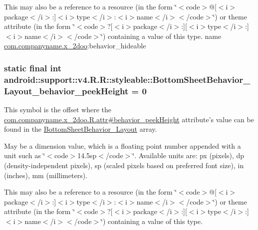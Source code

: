 This may also be a reference to a resource (in the form \char`\"{}$<$code$>$@\mbox{[}$<$i$>$package$<$/i$>$:\mbox{]}$<$i$>$type$<$/i$>$:$<$i$>$name$<$/i$>$$<$/code$>$\char`\"{}) or theme attribute (in the form \char`\"{}$<$code$>$?\mbox{[}$<$i$>$package$<$/i$>$:\mbox{]}\mbox{[}$<$i$>$type$<$/i$>$:\mbox{]}$<$i$>$name$<$/i$>$$<$/code$>$\char`\"{}) containing a value of this type.  name \hyperlink{namespacecom_1_1companyname_1_1x__2doo}{com.companyname.x\_\-2doo}:behavior\_\-hideable \hypertarget{classandroid_1_1support_1_1v4_1_1_r_1_1styleable_c5dfbc2d674faeb8b8e9c8aca7bace87}{
\subsubsection[{BottomSheetBehavior\_\-Layout\_\-behavior\_\-peekHeight}]{\setlength{\rightskip}{0pt plus 5cm}static final int android::support::v4.R.R::styleable::BottomSheetBehavior\_\-Layout\_\-behavior\_\-peekHeight = 0}}
\label{classandroid_1_1support_1_1v4_1_1_r_1_1styleable_c5dfbc2d674faeb8b8e9c8aca7bace87}


This symbol is the offset where the \hyperlink{classcom_1_1companyname_1_1x__2doo_1_1_r_1_1attr_71135c79275013f7c8e4eb0d1639031a}{com.companyname.x\_\-2doo.R.attr\#behavior\_\-peekHeight} attribute's value can be found in the \hyperlink{classandroid_1_1support_1_1v4_1_1_r_1_1styleable_d67360f84d04f5db038977a30714370e}{BottomSheetBehavior\_\-Layout} array.

May be a dimension value, which is a floating point number appended with a unit such as \char`\"{}$<$code$>$14.5sp$<$/code$>$\char`\"{}. Available units are: px (pixels), dp (density-independent pixels), sp (scaled pixels based on preferred font size), in (inches), mm (millimeters). 

This may also be a reference to a resource (in the form \char`\"{}$<$code$>$@\mbox{[}$<$i$>$package$<$/i$>$:\mbox{]}$<$i$>$type$<$/i$>$:$<$i$>$name$<$/i$>$$<$/code$>$\char`\"{}) or theme attribute (in the form \char`\"{}$<$code$>$?\mbox{[}$<$i$>$package$<$/i$>$:\mbox{]}\mbox{[}$<$i$>$type$<$/i$>$:\mbox{]}$<$i$>$name$<$/i$>$$<$/code$>$\char`\"{}) containing a value of this type. 

